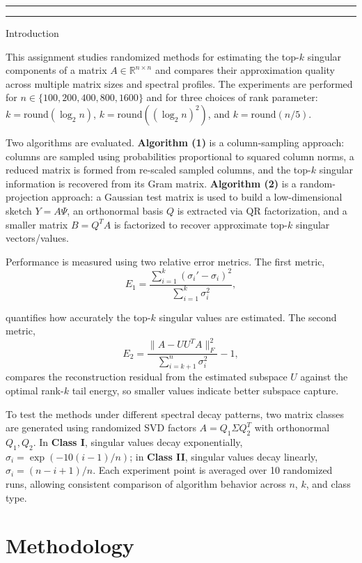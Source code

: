 \documentclass[8pt]{article}
\newcounter{questionCounter}
\newenvironment{question}[2][\arabic{questionCounter}]{%
    \addtocounter{questionCounter}{1}%
    \setcounter{partCounter}{0}%
    \vspace{.25in} \hrule \vspace{0.4em}%
        \noindent{\bf \iftoggle{questionnumbers}{#1: }{}#2}%
    \vspace{0.8em} \hrule \vspace{.10in}%
}{$ $\newpage}
\newcounter{partCounter}[questionCounter]
\begin{document}
\begin{question}
\section{Introduction}
\label{sec:introduction}

This assignment studies randomized methods for estimating the top-$k$ singular components of a matrix $A \in \mathbb{R}^{n\times n}$ and compares their approximation quality across multiple matrix sizes and spectral profiles. The experiments are performed for $n \in \{100, 200, 400, 800, 1600\}$ and for three choices of rank parameter: $k=\mathrm{round}(\log_2 n)$, $k=\mathrm{round}((\log_2 n)^2)$, and $k=\mathrm{round}(n/5)$.

Two algorithms are evaluated. \textbf{Algorithm (1)} is a column-sampling approach: columns are sampled using probabilities proportional to squared column norms, a reduced matrix is formed from re-scaled sampled columns, and the top-$k$ singular information is recovered from its Gram matrix. \textbf{Algorithm (2)} is a random-projection approach: a Gaussian test matrix is used to build a low-dimensional sketch $Y=A\Psi$, an orthonormal basis $Q$ is extracted via QR factorization, and a smaller matrix $B=Q^TA$ is factorized to recover approximate top-$k$ singular vectors/values.

Performance is measured using two relative error metrics. The first metric,
\[
E_1 = \frac{\sum_{i=1}^{k}(\sigma_i' - \sigma_i)^2}{\sum_{i=1}^{k}\sigma_i^2},
\]

quantifies how accurately the top-$k$ singular values are estimated. The second metric,
\[
E_2 = \frac{\|A-UU^TA\|_F^2}{\sum_{i=k+1}^{n}\sigma_i^2} - 1,
\]
compares the reconstruction residual from the estimated subspace $U$ against the optimal rank-$k$ tail energy, so smaller values indicate better subspace capture.

To test the methods under different spectral decay patterns, two matrix classes are generated using randomized SVD factors $A=Q_1\Sigma Q_2^T$ with orthonormal $Q_1,Q_2$. In \textbf{Class I}, singular values decay exponentially, $\sigma_i=\exp\!\left(-10(i-1)/n\right)$; in \textbf{Class II}, singular values decay linearly, $\sigma_i=(n-i+1)/n$. Each experiment point is averaged over 10 randomized runs, allowing consistent comparison of algorithm behavior across $n$, $k$, and class type.




\section{Methodology}
\label{sec:methodology}


\end{question}
\end{document}
